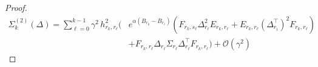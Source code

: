 \documentclass[11pt]{article}
\newcommand{\EE}{\mathbb{E}}
\newcommand{\cov}{\operatorname{Cov}}
\begin{document}
\begin{proof}
\begin{equation*}
\begin{split}
 \Sigma_{k}^{(2)}(\Delta) =  \sum_{\ell=0}^{k-1} \gamma^2 \,
 h_{r_k,r_{\ell}}^2 \biggl( & e^{\alpha(B_{r_k}- B_{r_\ell})} \left(F_{r_k,s_{\ell}} \Delta_{r_\ell}^2 E_{r_k,r_\ell} 
 + E_{r_k,r_\ell} (\Delta_{r_i}^\top)^2 F_{r_k,r_\ell} \right) \\ 
 &+ F_{r_k,r_\ell} \Delta_{r_\ell} \Sigma_{r_\ell} \Delta_{r_\ell}^\top F_{r_k,{r_\ell}} \biggr) + \mathcal{O}(\gamma^2) 
 \end{split}
 \end{equation*}

\end{proof}
\end{document}
